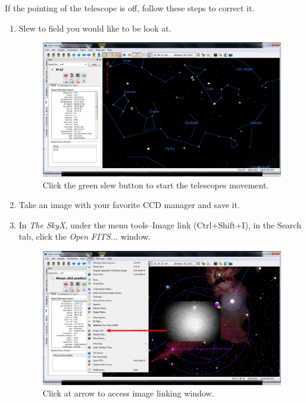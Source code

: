 \documentclass[12pt,twoside,a4paper]{report}
\begin{document}
If the pointing of the telescope is off, follow these steps to correct it.
\begin{enumerate}
 \item Slew to field you would like to be look at.
 \begin{figure}[h]
 \centering
    \includegraphics[width=\textwidth]{documentation_images/moving_telescope.png}
    \caption{\label{fig:moving_telescope} Click the green slew button to start the telescopes movement.}
\end{figure}
 \item \label{2} Take an image with your favorite CCD manager and save it.
 \item In \emph{The SkyX}, under the menu tools--Image link (Ctrl+Shift+I), in the Search tab, click the \emph{Open FITS...} window.
  \begin{figure}[h]
 \centering
    \includegraphics[width=\textwidth]{documentation_images/tools_menu_1_1.png}
    \caption{\label{fig:tools_menu} Click at arrow to access image linking window.}
    \end{figure}
    

\end{enumerate}
\end{document}
